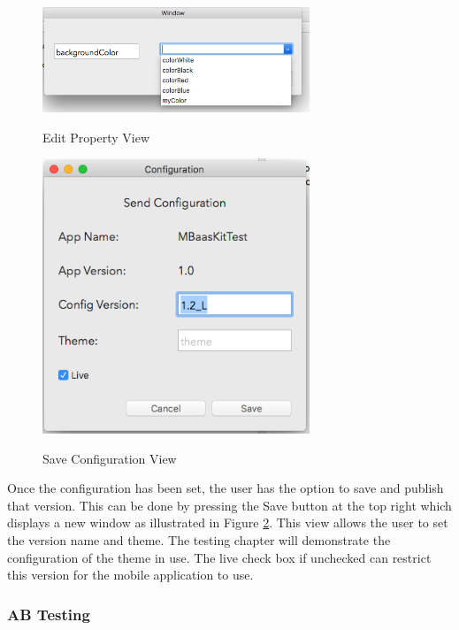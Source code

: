 

\begin{figure}[!h]
    \caption{Edit Property View}
    \centering
    \includegraphics[width=80mm]{images/dashboard/property-1}
    \label{fig:property1}
\end{figure} 

\begin{figure}[!h]
    \caption{Save Configuration View}
    \centering
    \includegraphics[width=80mm]{images/dashboard/configuration}
    \label{fig:configuration}
\end{figure} 

Once the configuration has been set, the user has the option to save and publish that version. This can be done by pressing the Save button at the top right which displays a new window as illustrated in Figure \ref{fig:configuration}. This view allows the user to set the version name and theme. The testing chapter will demonstrate the configuration of the theme in use. The live check box if unchecked can restrict this version for the mobile application to use.

\subsubsection{AB Testing}

